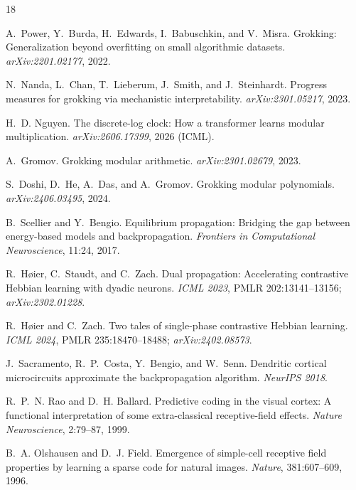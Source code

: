 \documentclass[11pt]{article}
\begin{document}

\begin{thebibliography}{18}

A.~Power, Y.~Burda, H.~Edwards, I.~Babuschkin, and V.~Misra.
\newblock Grokking: Generalization beyond overfitting on small algorithmic datasets.
\newblock \emph{arXiv:2201.02177}, 2022.

N.~Nanda, L.~Chan, T.~Lieberum, J.~Smith, and J.~Steinhardt.
\newblock Progress measures for grokking via mechanistic interpretability.
\newblock \emph{arXiv:2301.05217}, 2023.

H.~D. Nguyen.
\newblock The discrete-log clock: How a transformer learns modular multiplication.
\newblock \emph{arXiv:2606.17399}, 2026 (ICML).

A.~Gromov.
\newblock Grokking modular arithmetic.
\newblock \emph{arXiv:2301.02679}, 2023.

S.~Doshi, D.~He, A.~Das, and A.~Gromov.
\newblock Grokking modular polynomials.
\newblock \emph{arXiv:2406.03495}, 2024.

B.~Scellier and Y.~Bengio.
\newblock Equilibrium propagation: Bridging the gap between energy-based models and backpropagation.
\newblock \emph{Frontiers in Computational Neuroscience}, 11:24, 2017.

R.~H{\o}ier, C.~Staudt, and C.~Zach.
\newblock Dual propagation: Accelerating contrastive Hebbian learning with dyadic neurons.
\newblock \emph{ICML 2023}, PMLR 202:13141--13156; \emph{arXiv:2302.01228}.

R.~H{\o}ier and C.~Zach.
\newblock Two tales of single-phase contrastive Hebbian learning.
\newblock \emph{ICML 2024}, PMLR 235:18470--18488; \emph{arXiv:2402.08573}.

J.~Sacramento, R.~P.~Costa, Y.~Bengio, and W.~Senn.
\newblock Dendritic cortical microcircuits approximate the backpropagation algorithm.
\newblock \emph{NeurIPS 2018}.

R.~P.~N. Rao and D.~H. Ballard.
\newblock Predictive coding in the visual cortex: A functional interpretation of some extra-classical receptive-field effects.
\newblock \emph{Nature Neuroscience}, 2:79--87, 1999.

B.~A. Olshausen and D.~J. Field.
\newblock Emergence of simple-cell receptive field properties by learning a sparse code for natural images.
\newblock \emph{Nature}, 381:607--609, 1996.


\end{thebibliography}
\end{document}
